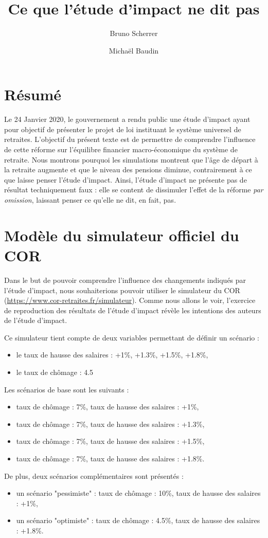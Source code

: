 \documentclass[10pt]{article}
\title{Ce que l'étude d'impact ne dit pas}
\author{Bruno Scherrer \and Michaël Baudin}
\begin{document}
\maketitle

\section{Résumé}

Le 24 Janvier 2020, le gouvernement a rendu public une 
étude d'impact ayant pour objectif de présenter le projet 
de loi instituant le système universel de retraites. 
L'objectif du présent texte est de permettre de comprendre 
l'influence de cette réforme sur l'équilibre financier macro-économique 
du système de retraite. 
Nous montrons pourquoi les simulations montrent que l'âge de départ à la 
retraite augmente et que le niveau des pensions diminue, contrairement à ce que laisse 
penser l'étude d'impact. 
Ainsi, l'étude d'impact ne présente pas de résultat techniquement faux : 
elle se content de dissimuler l'effet de la réforme \emph{par omission}, 
laissant penser ce qu'elle ne dit, en fait, pas. 


\section{Modèle du simulateur officiel du COR}

Dans le but de pouvoir comprendre l'influence des changements indiqués par 
l'étude d'impact, nous souhaiterions pouvoir utiliser le simulateur du COR 
(\url{https://www.cor-retraites.fr/simulateur}). 
Comme nous allons le voir, l'exercice de reproduction des résultats 
de l'étude d'impact révèle les intentions des auteurs de l'étude d'impact. 

Ce simulateur tient compte de deux variables permettant de définir un scénario :
\begin{itemize}
\item le taux de hausse des salaires : +1\%, +1.3\%, +1.5\%, +1.8\%, 
\item le taux de chômage : 4.5%
\end{itemize}

Les scénarios de base sont les suivants :
\begin{itemize}
\item taux de chômage : 7\%, taux de hausse des salaires : +1\%, 
\item taux de chômage : 7\%, taux de hausse des salaires : +1.3\%, 
\item taux de chômage : 7\%, taux de hausse des salaires : +1.5\%, 
\item taux de chômage : 7\%, taux de hausse des salaires : +1.8\%.
\end{itemize}
De plus, deux scénarios complémentaires sont présentés :
\begin{itemize}
\item un scénario "pessimiste" : taux de chômage : 10\%, taux de hausse des salaires : +1\%, 
\item un scénario "optimiste" : taux de chômage : 4.5\%, taux de hausse des salaires : +1.8\%. 
\end{itemize}
\end{document}

